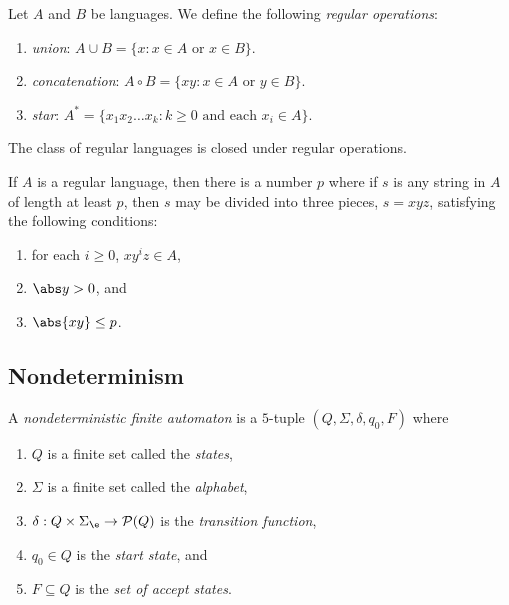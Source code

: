 \documentclass{article}
\begin{document}
\begin{definition}[Sipser p. 44]
    Let $A$ and $B$ be languages. We define the following \emph{regular operations}:
    \begin{enumerate}
        \item \emph{union}: $A\cup B=\{x : x \in A \text{ or } x \in B\}$.
        \item \emph{concatenation}: $A\circ B=\{xy : x \in A \text{ or } y \in B\}$.
        \item \emph{star}: $A^* = \{x_1x_2\dots x_k:k\geq 0 \text{ and each }x_i\in A\}$.
    \end{enumerate}
\end{definition}

\begin{theorem}[Sipser p. 45, 60, 62]
    The class of regular languages is closed under regular operations.
\end{theorem}

\begin{theorem}
    If $A$ is a regular language, then there is a number $p$ where if $s$
    is any string in $A$ of length at least $p$, then $s$ may be divided 
    into three pieces, $s=xyz$, satisfying the following conditions:
    \begin{enumerate}
        \item for each $i\geq 0$, $xy^iz\in A$,
        \item $\abs y > 0$, and 
        \item $\abs{xy} \leq p$.
    \end{enumerate} 
\end{theorem}

\subsection{Nondeterminism}

\begin{definition}[Sipser p. 53]
    A \emph{nondeterministic finite automaton} is a $5$-tuple $(Q,\Sigma,\delta,q_0,F)$ where 
    \begin{enumerate}
        \item $Q$ is a finite set called the \emph{states},
        \item $\Sigma$ is a finite set called the \emph{alphabet},
        \item $\delta:Q\times\Sigma_\e\to \mathcal{P}(Q)$ is the \emph{transition function},
        \item $q_0\in Q$ is the \emph{start state}, and 
        \item $F\subseteq Q$ is the \emph{set of accept states}.
    \end{enumerate} 
\end{definition}
\end{document}
